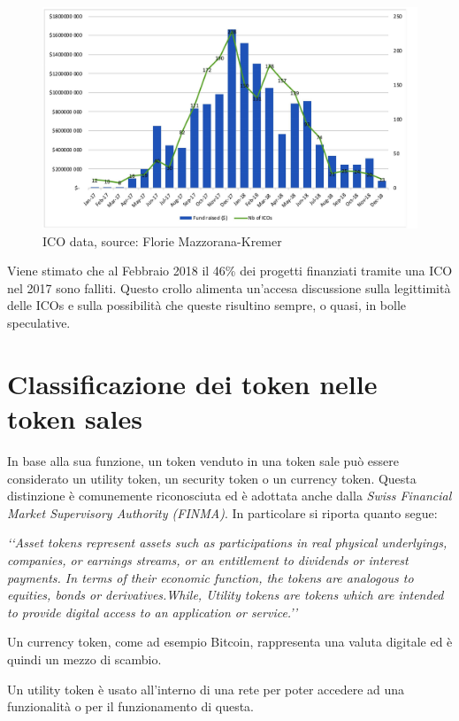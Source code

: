 \begin{figure}[H]
  \includegraphics[width=\linewidth]{ico.jpg}
  \caption{ICO data, source: Florie Mazzorana-Kremer\cite{K30}}
  \label{fig:ico}
\end{figure}

Viene stimato che al Febbraio 2018 il 46\% dei progetti finanziati tramite una ICO nel 2017 sono falliti. Questo crollo alimenta un'accesa discussione sulla legittimità delle ICOs e sulla possibilità che queste risultino sempre, o quasi, in bolle speculative.

\section{Classificazione dei token nelle token sales}
In base alla sua funzione, un token venduto in una token sale può essere considerato un utility token, un security token o un currency token. Questa distinzione è comunemente riconosciuta ed è adottata anche dalla \textit{Swiss Financial Market Supervisory Authority (FINMA)}. In particolare si riporta quanto segue:

\textit{‘‘Asset tokens represent assets such as participations in real physical underlyings, companies, or earnings streams, or an entitlement to dividends or interest payments. In terms of their economic function, the tokens are analogous to equities, bonds or derivatives.While, Utility tokens are tokens which are intended to provide digital access to an application or service.’’}


Un currency token, come ad esempio Bitcoin, rappresenta una valuta digitale ed è quindi un mezzo di scambio.

Un utility token è usato all'interno di una rete per poter accedere ad una funzionalità o per il funzionamento di questa. 

